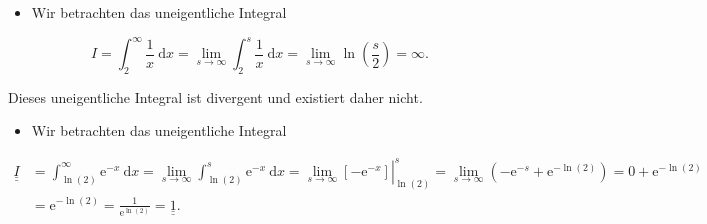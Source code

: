 \documentclass[10pt]{article}
\begin{document}
\begin{itemize}
  \item Wir betrachten das uneigentliche Integral
\end{itemize}


\begin{equation*}
I=\int_{2}^{\infty} \frac{1}{x} \mathrm{~d} x=\lim _{s \rightarrow \infty} \int_{2}^{s} \frac{1}{x} \mathrm{~d} x=\lim _{s \rightarrow \infty} \ln \left(\frac{s}{2}\right)=\infty . \tag{3.31}
\end{equation*}


Dieses uneigentliche Integral ist divergent und existiert daher nicht.

\begin{itemize}
  \item Wir betrachten das uneigentliche Integral
\end{itemize}


\begin{align*}
\underline{\underline{I}} & =\int_{\ln (2)}^{\infty} \mathrm{e}^{-x} \mathrm{~d} x=\lim _{s \rightarrow \infty} \int_{\ln (2)}^{s} \mathrm{e}^{-x} \mathrm{~d} x=\left.\lim _{s \rightarrow \infty}\left[-\mathrm{e}^{-x}\right]\right|_{\ln (2)} ^{s}=\lim _{s \rightarrow \infty}\left(-\mathrm{e}^{-s}+\mathrm{e}^{-\ln (2)}\right)=0+\mathrm{e}^{-\ln (2)} \\
& =\mathrm{e}^{-\ln (2)}=\frac{1}{\mathrm{e}^{\ln (2)}}=\underline{\underline{1}} . \tag{3.32}
\end{align*}
\end{document}
